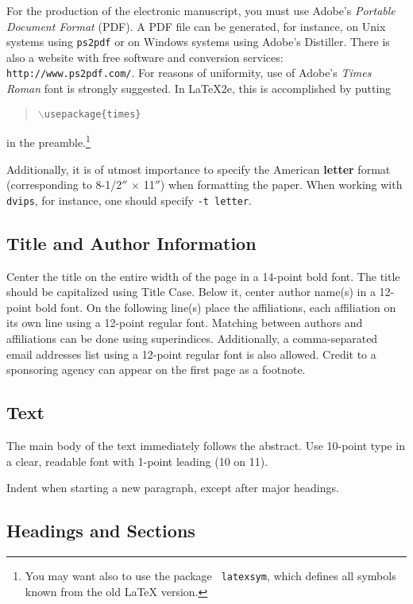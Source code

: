 \documentclass{article}
\begin{document}
For the production of the electronic manuscript, you must use Adobe's
{\em Portable Document Format} (PDF). A PDF file can be generated, for
instance, on Unix systems using {\tt ps2pdf} or on Windows systems
using Adobe's Distiller. There is also a website with free software
and conversion services: {\tt http://www.ps2pdf.com/}. For reasons of
uniformity, use of Adobe's {\em Times Roman} font is strongly suggested. In
\LaTeX2e{}, this is accomplished by putting
\begin{quote} 
\mbox{\tt $\backslash$usepackage\{times\}}
\end{quote}
in the preamble.\footnote{You may want also to use the package {\tt
latexsym}, which defines all symbols known from the old \LaTeX{}
version.}
  
Additionally, it is of utmost importance to specify the American {\bf
letter} format (corresponding to 8-1/2$''$ $\times$ 11$''$) when
formatting the paper. When working with {\tt dvips}, for instance, one
should specify {\tt -t letter}.

\subsection{Title and Author Information}

Center the title on the entire width of the page in a 14-point bold
font. The title should be capitalized using Title Case. Below it, center author name(s) in a 12-point bold font. On the following line(s) place the affiliations, each affiliation on its own line using a 12-point regular font. Matching between authors and affiliations can be done using superindices. Additionally, a comma-separated email addresses list using a 12-point regular font is also allowed. Credit to a
sponsoring agency can appear on the first page as a footnote.

\subsection{Text}

The main body of the text immediately follows the abstract. Use
10-point type in a clear, readable font with 1-point leading (10 on
11).

Indent when starting a new paragraph, except after major headings.

\subsection{Headings and Sections}
\end{document}
